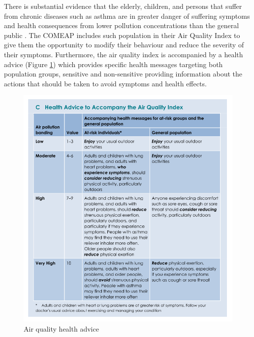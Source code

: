There is substantial evidence that the elderly, children, and persons that suffer from chronic diseases such as asthma are in greater danger of suffering symptoms and health consequences from lower pollution concentrations than the general public \cite{Koenig1999} \cite{Kampa2008} \cite{Zones2010} . The COMEAP includes such population in their Air Quality Index to give them the opportunity to modify their behaviour and reduce the severity of their symptoms. Furthermore, the air quality index is accompanied by a health advice (Figure \ref{fig:air_quality_health_advice}) which provides specific health messages targeting both population groups, sensitive and non-sensitive providing information about the actions that should be taken to avoid symptoms and health effects.

\begin{figure}[H]
\begin{adjustbox}{width=1\textwidth,center=\textwidth}
  \centering
  \includegraphics[scale=.8]{images/air_quality_health_advice.png}
\end{adjustbox}
  \caption[Air quality health advice]{Air quality health advice \cite{HealthProtectionAgencyfortheCommitteeontheMedicalEffectsofAirPollutants2011}}
  \label{fig:air_quality_health_advice}
\end{figure}


